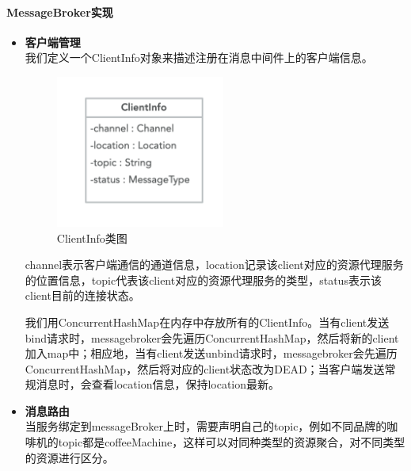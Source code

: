 \documentclass[a4paper, 12pt]{article}
\theoremstyle{definition}
\begin{document}
\paragraph{MessageBroker实现}
\begin{itemize}
    \item {\textbf{客户端管理}}\\
    我们定义一个ClientInfo对象来描述注册在消息中间件上的客户端信息。
    
    \begin{figure}[ht]
    \centering
    \includegraphics[height=5cm]{images/channelInfo.jpg}
    \caption{ClientInfo类图}
    \label{fig:singleblock}
    \end{figure}
    
    channel表示客户端通信的通道信息，location记录该client对应的资源代理服务的位置信息，topic代表该client对应的资源代理服务的类型，status表示该client目前的连接状态。
    
    我们用ConcurrentHashMap在内存中存放所有的ClientInfo。当有client发送bind请求时，messagebroker会先遍历ConcurrentHashMap，然后将新的client加入map中；相应地，当有client发送unbind请求时，messagebroker会先遍历ConcurrentHashMap，然后将对应的client状态改为DEAD；当客户端发送常规消息时，会查看location信息，保持location最新。
    \item {\textbf{消息路由}}\\
    当服务绑定到messageBroker上时，需要声明自己的topic，例如不同品牌的咖啡机的topic都是coffeeMachine，这样可以对同种类型的资源聚合，对不同类型的资源进行区分。
\end{itemize}
\end{document}

